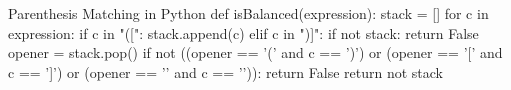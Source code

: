 \begin{pycode}{Parenthesis Matching in Python}
def isBalanced(expression):
	stack = []
	for c in expression:
		if c in "([{":
			stack.append(c)
		elif c in ")]}":
			if not stack:
				return False
	opener = stack.pop()
	if not ((opener == '(' and c == ')') or 
			(opener == '[' and c == ']') or 
			(opener == '{' and c == '}')):
		return False
	return not stack
\end{pycode}
